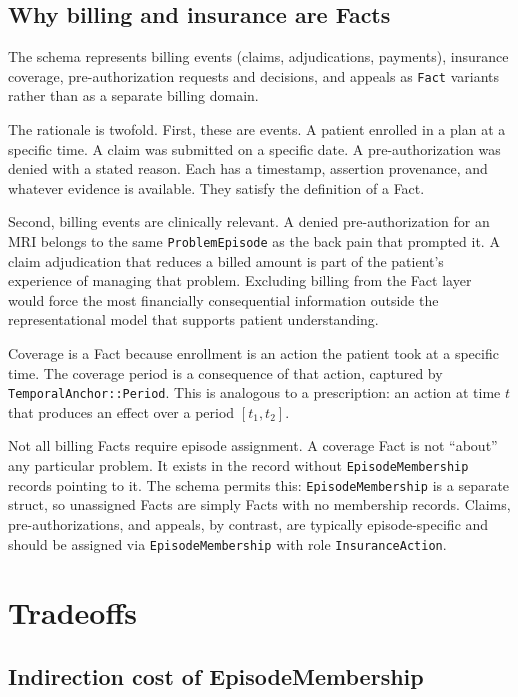 \documentclass[11pt]{article}
\begin{document}
\subsection{Why billing and insurance are Facts}
\label{sec:billing-rationale}

The schema represents billing events (claims, adjudications, payments),
insurance coverage, pre-authorization requests and decisions, and appeals as
\texttt{Fact} variants rather than as a separate billing domain.

The rationale is twofold. First, these are events. A patient enrolled in a
plan at a specific time. A claim was submitted on a specific date. A
pre-authorization was denied with a stated reason. Each has a timestamp,
assertion provenance, and whatever evidence is available. They satisfy the
definition of a Fact.

Second, billing events are clinically relevant. A denied pre-authorization
for an MRI belongs to the same \texttt{ProblemEpisode} as the back pain that
prompted it. A claim adjudication that reduces a billed amount is part of the
patient's experience of managing that problem. Excluding billing from the
Fact layer would force the most financially consequential information outside
the representational model that supports patient understanding.

Coverage is a Fact because enrollment is an action the patient took at a
specific time. The coverage period is a consequence of that action, captured
by \texttt{TemporalAnchor::Period}. This is analogous to a prescription: an
action at time $t$ that produces an effect over a period $[t_1, t_2]$.

Not all billing Facts require episode assignment. A coverage Fact is not
``about'' any particular problem. It exists in the record without
\texttt{EpisodeMembership} records pointing to it. The schema permits this:
\texttt{EpisodeMembership} is a separate struct, so unassigned Facts are
simply Facts with no membership records. Claims, pre-authorizations, and
appeals, by contrast, are typically episode-specific and should be assigned
via \texttt{EpisodeMembership} with role \texttt{InsuranceAction}.

\section{Tradeoffs}
\label{sec:tradeoffs}

\subsection{Indirection cost of EpisodeMembership}
\end{document}

